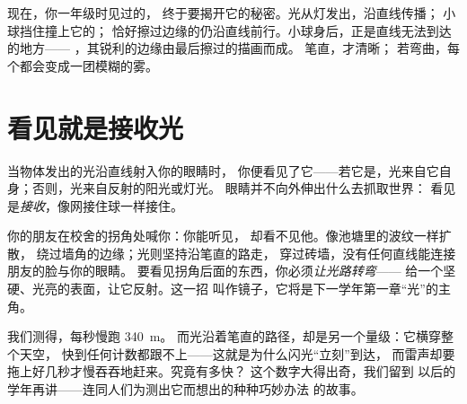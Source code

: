 \begin{example}[影子的成因终于讲清]\label{ex:g4:light-straight-lines:shadows}
现在，你一年级时见过的，
终于要揭开它的秘密。光从灯发出，沿直线传播；
小球挡住撞上它的；
恰好擦过边缘的仍沿直线前行。小球身后，正是直线无法到达的地方——
，其锐利的边缘由最后擦过的描画而成。
笔直，才清晰；
若弯曲，每个都会变成一团模糊的雾。
\end{example}

\section{看见就是接收光}

\begin{proposition}[看见是怎样发生的]\label{prop:g4:light-straight-lines:seeing}
当物体发出的光沿直线射入你的眼睛时，
你便看见了它——若它是，光来自它自身；否则，光来自反射的阳光或灯光。
眼睛并不向外伸出什么去抓取世界：
看见是\emph{接收}，像网接住球一样接住。
\end{proposition}

\begin{example}[绕过墙角]\label{ex:g4:light-straight-lines:corner}
你的朋友在校舍的拐角处喊你：你能听见，
却看不见他。像池塘里的波纹一样扩散，
绕过墙角的边缘；光则坚持沿笔直的路走，
穿过砖墙，没有任何直线能连接朋友的脸与你的眼睛。
要看见拐角后面的东西，你必须\emph{让光路转弯}——
给一个坚硬、光亮的表面，让它反射。这一招
叫作镜子，它将是下一学年第一章“光”的主角。
\end{example}

\begin{remark}[最快的跑者]\label{rem:g4:light-straight-lines:speed}
我们测得，每秒慢跑 \qty{340}{m}。
而光沿着笔直的路径，却是另一个量级：它横穿整个天空，
快到任何计数都跟不上——这就是为什么闪光“立刻”到达，
而雷声却要拖上好几秒才慢吞吞地赶来。究竟有多快？
这个数字大得出奇，我们留到
以后的学年再讲——连同人们为测出它而想出的种种巧妙办法
的故事。
\end{remark}

